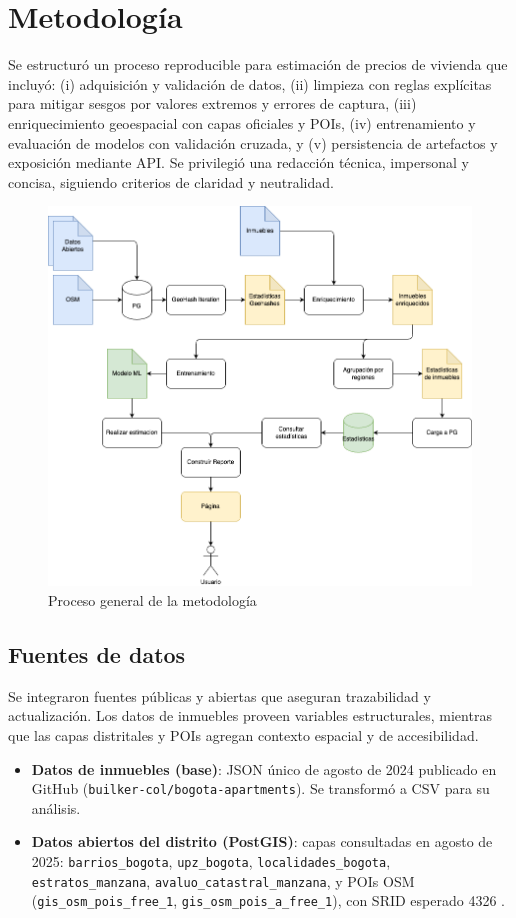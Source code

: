 \section*{Metodología}
Se estructuró un proceso reproducible para estimación de precios de vivienda que incluyó: (i) adquisición y validación de datos, (ii) limpieza con reglas explícitas para mitigar sesgos por valores extremos y errores de captura, (iii) enriquecimiento geoespacial con capas oficiales y POIs, (iv) entrenamiento y evaluación de modelos con validación cruzada, y (v) persistencia de artefactos y exposición mediante API. Se privilegió una redacción técnica, impersonal y concisa, siguiendo criterios de claridad y neutralidad.

\begin{figure}[h]
    \centering
    \includegraphics[width=0.85\linewidth]{Images/metodologia.png}
    \caption{Proceso general de la metodología}
    \label{fig:metodologia}
\end{figure}

\subsection*{Fuentes de datos}
Se integraron fuentes públicas y abiertas que aseguran trazabilidad y actualización. Los datos de inmuebles proveen variables estructurales, mientras que las capas distritales y POIs agregan contexto espacial y de accesibilidad.
\begin{itemize}
    \item \textbf{Datos de inmuebles (base)}: JSON único de agosto de 2024 publicado en GitHub (\texttt{builker-col/bogota-apartments}). Se transformó a CSV para su análisis.
    \item \textbf{Datos abiertos del distrito (PostGIS)}: capas consultadas en agosto de 2025: \texttt{barrios\_bogota}, \texttt{upz\_bogota}, \texttt{localidades\_bogota}, \texttt{estratos\_manzana}, \texttt{avaluo\_catastral\_manzana}, y POIs OSM (\texttt{gis\_osm\_pois\_free\_1}\allowbreak, \texttt{gis\_osm\_pois\_a\_free\_1}), con SRID esperado 4326 \cite{datosabiertos_bogota}.
\end{itemize}

